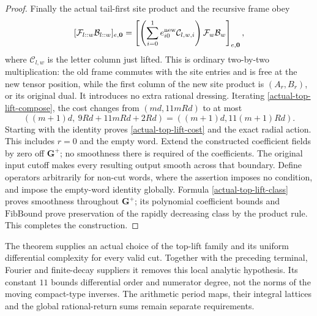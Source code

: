 \begin{proof}
Finally the actual tail-first site product and the recursive
frame obey
\begin{equation}\label{actual-top-lift-word}
 [\mathcal F_{l::w}\mathcal B_{l::w}]_{e,\mathbf0}
 =\left[\left(\sum_{i=0}^1 e_{i0}^{\rm new}
                           \mathcal C_{l,w,i}\right)
                       \mathcal F_w\mathcal B_w\right]_{e,\mathbf0},
\end{equation}
where $\mathcal C_{l,w}$ is the letter column just lifted.
This is ordinary two-by-two multiplication: the old frame
commutes with the site entries and is free at the new tensor
position, while the first column of the new site product is
$(A_r,B_r)$, or its original dual.  It introduces no extra
rational dressing.  Iterating
\eqref{actual-top-lift-compose}, the cost changes from
$(md,11mRd)$ to at most
\[
 ((m+1)d,\ 9Rd+11mRd+2Rd)
                       =((m+1)d,11(m+1)Rd).
\]
Starting with the identity proves \eqref{actual-top-lift-cost}
and the exact radial action.  This includes $r=0$ and the
empty word.  Extend the constructed coefficient fields by
zero off $\mathbf G^+$; no smoothness there is required of
the coefficients.  The original input cutoff makes every
resulting output smooth across that boundary.  Define
operators arbitrarily for non-cut words, where the assertion
imposes no condition, and impose the empty-word identity
globally.  Formula
\eqref{actual-top-lift-class} proves smoothness throughout
$\mathbf G^+$; its polynomial coefficient bounds and
$\mathrm{FibBound}$ prove preservation of the rapidly
decreasing class by the product rule.  This completes the
construction.\cite{top-lift-word-source}
\end{proof}

The theorem supplies an actual choice of the top-lift family
and its uniform differential complexity for every valid cut.
Together with the preceding terminal, Fourier and finite-decay
suppliers it removes this local analytic hypothesis.  Its
constant $11$ bounds differential order and numerator degree,
not the norms of the moving compact-type inverses.  The
arithmetic period maps, their integral lattices and the global
rational-return sums remain separate requirements.

